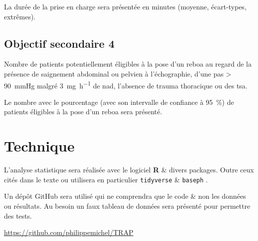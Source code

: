 \documentclass[
  a4paper,
  french]{scrreprt}
\begin{document}
La durée de la prise en charge sera présentée en minutes (moyenne,
écart-types, extrêmes).

\section{Objectif secondaire 4}\label{objectif-secondaire-4}

\begin{tcolorbox}
Nombre de patients potentiellement éligibles à la pose d’un \gls{reboa} au regard de la présence de saignement abdominal ou pelvien à l’échographie, d’une \gls{pas} > \qty{90}{\mmHg} malgré \qty{3}{\mg\per\hour} de \gls{nad}, l’absence de trauma thoracique ou des \gls{tsa}.
\end{tcolorbox}

Le nombre avec le pourcentage (avec son intervalle de confiance à
\qty{95}{\percent}) de patients éligibles à la pose d'un \gls{reboa}
sera présenté.

\chapter{Technique}\label{technique}

L'analyse statistique sera réalisée avec le logiciel
\textbf{R}\autocite{rstat} \& divers packages. Outre ceux cités dans le
texte ou utilisera en particulier \texttt{tidyverse} \autocite{tidy} \&
\texttt{baseph} \autocite{baseph}.

Un dépôt GitHub sera utilisé qui ne comprendra que le code \& non les
données ou résultats. Au besoin un faux tableau de données sera présenté
pour permettre des tests.

\url{https://github.com/philippemichel/TRAP}

\printglossary[ title={Abréviations \& Acronymes}, toctitle={Abréviations \& Acronymes}]

\printglossary[type = stat, title={Glossaire statistique}, toctitle={Glossaire statistique}]



\printbibliography
\end{document}
